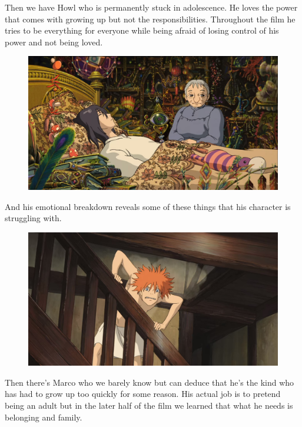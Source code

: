 \documentclass[11pt, letterpaper]{article}
\begin{document}
Then we have Howl who is permanently stuck in adolescence. He loves the power that comes with growing up but not the responsibilities. Throughout the film he tries to be everything for everyone while being afraid of losing control of his power and not being loved. 

\begin{figure}[H]
\includegraphics[width=\textwidth]{adolesence.jpg}
\centering
\end{figure} 

And his emotional breakdown reveals some of these things that his character is struggling with.

\begin{figure}[H]
\includegraphics[width=\textwidth]{breakdown.jpg}
\centering
\end{figure}

Then there's Marco who we barely know but can deduce that he's the kind who has had to grow up too quickly for some reason. His actual job is to pretend being an adult but in the later half of the film we learned that what he needs is belonging and family. 
\end{document}
